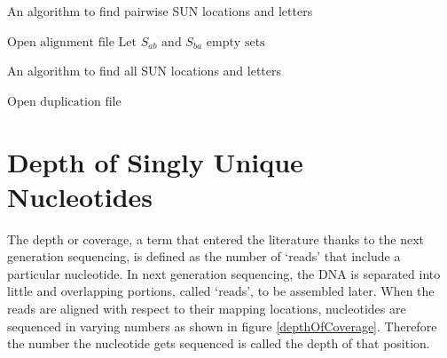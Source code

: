 \begin{algorithm}
\caption{An algorithm to find pairwise SUN locations and letters}
\label{getRelativeSun}
\begin{algorithmic}[1]
\State $\text{Open alignment file}$
\State $\text{Let } S_{ab} \text{ and } S_{ba} \text{ empty sets}$
\EndIf
{}
\EndIf
{}
\EndIf
{}
\EndIf
\EndIf
\EndFor
\EndWhile
\EndIf
\EndProcedure
\end{algorithmic}
\end{algorithm}


\begin{algorithm}
\caption{An algorithm to find all SUN locations and letters}
\label{allSun}
\begin{algorithmic}[1]
\State $\text{Open duplication file}$
\Else
{}
\EndIf
{}
\Else
{}
\EndIf
\EndFor
\EndIf
\EndProcedure
\end{algorithmic}
\end{algorithm}
\section{Depth of Singly Unique Nucleotides}
The depth or coverage, a term that entered the literature thanks to the next generation sequencing, is defined as the number of `reads' that include a particular nucleotide. In next generation sequencing, the DNA is separated into little and overlapping portions, called `reads', to be assembled later. When the reads are aligned with respect to their mapping locations, nucleotides are sequenced in varying numbers as shown in figure \ref{depthOfCoverage}. Therefore the number the nucleotide gets sequenced is called the depth of that position.

